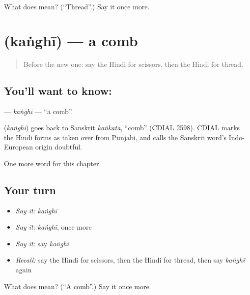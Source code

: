 \begin{tcolorbox}[breakable,colback=teal!4,colframe=teal!35!black,title={Before you move on}]
What does  mean? (\textquotedblleft{}Thread\textquotedblright{}.) Say it once more.
\end{tcolorbox}
\section[\texorpdfstring{\hi{कंघी} (kaṅghī)}{कंघी (kaṅghī)}]{ (kaṅghī) — a comb}

\label{lesson:HI-C130-kanghi}



\begin{quote}
Before the new one: say the Hindi for scissors, then the Hindi for thread.
\end{quote}

\subsection*{You'll want to know: }
\textbf{} — \emph{kaṅghī} — \textquotedblleft{}a comb\textquotedblright{}.

\begin{cousinweb}
\textbf{} (\emph{kaṅghī}) goes back to Sanskrit \emph{kaṅkata}, \textquotedblleft{}comb\textquotedblright{} (CDIAL 2598). CDIAL marks the Hindi forms as taken over from Punjabi, and calls the Sanskrit word's Indo-European origin doubtful.
\end{cousinweb}

\begin{grammarlens}[title={What you've built}]
One more word for this chapter.
\end{grammarlens}

\subsection*{Your turn}
\begin{itemize}
\raggedright
  \item \emph{Say it:} \emph{kaṅghī}
  \item \emph{Say it:} \emph{kaṅghī}, once more
  \item \emph{Say it:} say \emph{kaṅghī}
  \item \emph{Recall:} say the Hindi for scissors, then the Hindi for thread, then say \emph{kaṅghī} again
\end{itemize}

\begin{tcolorbox}[breakable,colback=teal!4,colframe=teal!35!black,title={Before you move on}]
What does  mean? (\textquotedblleft{}A comb\textquotedblright{}.) Say it once more.
\end{tcolorbox}
